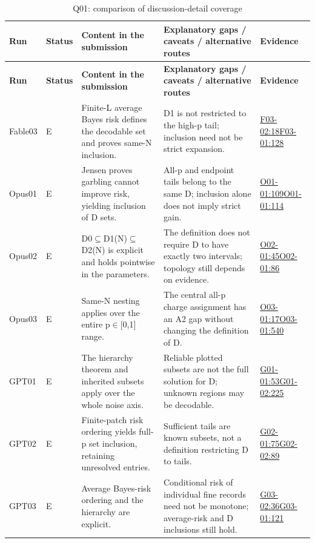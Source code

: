 \documentclass[11pt,a4paper]{article}
\begin{document}
{\fontsize{9.0}{12.6}\selectfont
\setlength{\tabcolsep}{2.5pt}
\begin{longtable}{>{\raggedright\arraybackslash}p{}>{\raggedright\arraybackslash}p{}>{\raggedright\arraybackslash}p{}>{\raggedright\arraybackslash}p{}>{\raggedright\arraybackslash}p{}}
\caption{Q01: comparison of discussion-detail coverage}\\
\toprule
\textbf{Run} & \textbf{Status} & \textbf{Content in the submission} & \textbf{Explanatory gaps /\allowbreak{} caveats /\allowbreak{} alternative routes} & \textbf{Evidence}\tabularnewline
\midrule
\endfirsthead
\toprule
\textbf{Run} & \textbf{Status} & \textbf{Content in the submission} & \textbf{Explanatory gaps /\allowbreak{} caveats /\allowbreak{} alternative routes} & \textbf{Evidence}\tabularnewline
\midrule
\endhead
{}Fable03 & E & Finite-L average Bayes risk defines the decodable set and proves same-N inclusion. & D1 is not restricted to the high-p tail; inclusion need not be strict expansion. & \hyperref[src:F03-02]{F03-02:18}\newline \hyperref[src:F03-01]{F03-01:128}\tabularnewline
{}Opus01 & E & Jensen proves garbling cannot improve risk,\allowbreak{} yielding inclusion of D sets. & All-p and endpoint tails belong to the same D; inclusion alone does not imply strict gain. & \hyperref[src:O01-01]{O01-01:109}\newline \hyperref[src:O01-01]{O01-01:114}\tabularnewline
{}Opus02 & E & D0\ensuremath{\subseteq}D1(N)\ensuremath{\subseteq}D2(N) is explicit and holds pointwise in the parameters. & The definition does not require D to have exactly two intervals; topology still depends on evidence. & \hyperref[src:O02-01]{O02-01:45}\newline \hyperref[src:O02-01]{O02-01:86}\tabularnewline
{}Opus03 & E & Same-N nesting applies over the entire p\ensuremath{\in}[0,\allowbreak{}1] range. & The central all-p charge assignment has an A2 gap without changing the definition of D. & \hyperref[src:O03-01]{O03-01:17}\newline \hyperref[src:O03-01]{O03-01:540}\tabularnewline
{}GPT01 & E & The hierarchy theorem and inherited subsets apply over the whole noise axis. & Reliable plotted subsets are not the full solution for D; unknown regions may be decodable. & \hyperref[src:G01-01]{G01-01:53}\newline \hyperref[src:G01-02]{G01-02:225}\tabularnewline
{}GPT02 & E & Finite-patch risk ordering yields full-p set inclusion,\allowbreak{} retaining unresolved entries. & Sufficient tails are known subsets,\allowbreak{} not a definition restricting D to tails. & \hyperref[src:G02-01]{G02-01:75}\newline \hyperref[src:G02-02]{G02-02:89}\tabularnewline
{}GPT03 & E & Average Bayes-risk ordering and the hierarchy are explicit. & Conditional risk of individual fine records need not be monotone; average-risk and D inclusions still hold. & \hyperref[src:G03-02]{G03-02:36}\newline \hyperref[src:G03-01]{G03-01:121}\tabularnewline
\bottomrule
\end{longtable}
}
\end{document}
